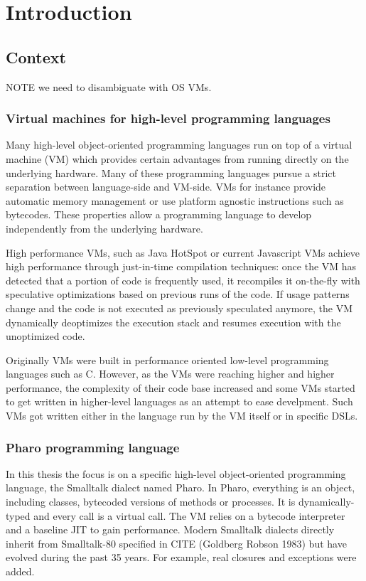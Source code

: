 \documentclass[a4paper,12pt,twoside]{../includes/ThesisStyle}
\begin{document}
\fi

\chapter{Introduction}
\label{chap:intro}
\minitoc

\section{Context}

NOTE we need to disambiguate with OS VMs.

\subsection{Virtual machines for high-level programming languages}

Many high-level object-oriented programming languages run on top of a virtual machine (VM) which provides certain advantages from running directly on the underlying hardware. Many of these programming languages pursue a strict separation between language-side and VM-side. VMs for instance provide automatic memory management or use platform agnostic instructions such as bytecodes. These properties allow a programming language to develop independently from the underlying hardware.

High performance VMs, such as Java HotSpot or current Javascript VMs achieve high performance through just-in-time compilation techniques: once the VM has detected that a portion of code is frequently used, it recompiles it on-the-fly with speculative optimizations based on previous runs of the code. If usage patterns change and the code is not executed as previously speculated anymore, the VM dynamically deoptimizes the execution stack and resumes execution with the unoptimized code.

Originally VMs were built in performance oriented low-level programming languages such as C. However, as the VMs were reaching higher and higher performance, the complexity of their code base increased and some VMs started to get written in higher-level languages as an attempt to ease develpment. Such VMs got written either in the language run by the VM itself or in specific DSLs.

\subsection{Pharo programming language}

In this thesis the focus is on a specific high-level object-oriented programming language, the Smalltalk dialect named Pharo. In Pharo, everything is an object, including classes, bytecoded versions of methods or processes. It is dynamically-typed and every call is a virtual call. The VM relies on a bytecode interpreter and a baseline JIT to gain performance. Modern Smalltalk dialects directly inherit from Smalltalk-80 specified in CITE (Goldberg  Robson 1983) but have evolved during the past 35 years. For example, real closures and exceptions were added.
\end{document}
